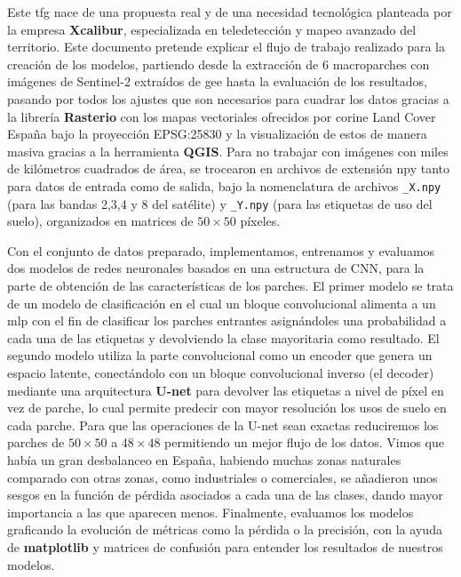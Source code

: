 Este \acrfull{tfg} nace de una propuesta real y de una necesidad tecnológica planteada por la empresa \textbf{Xcalibur}, especializada en 
teledetección y mapeo avanzado del territorio. Este documento pretende explicar el flujo de trabajo realizado para la creación de los modelos,
partiendo desde la extracción de 6 macroparches con imágenes de Sentinel-2 extraídos de \acrfull{gee} hasta la evaluación de los resultados, pasando 
por todos los ajustes que son necesarios para cuadrar los datos gracias a la librería \textbf{Rasterio} con los mapas vectoriales ofrecidos por 
\acrshort{corine} Land Cover España bajo la proyección EPSG:25830 y la visualización de estos de manera masiva gracias a la herramienta 
\textbf{QGIS}. Para no trabajar con imágenes con miles de kilómetros cuadrados de área, se trocearon en archivos de extensión npy tanto para 
datos de entrada como de salida, bajo la nomenclatura de archivos \texttt{\_X.npy} (para las bandas 2,3,4 y 8 del satélite) y \texttt{\_Y.npy} 
(para las etiquetas de uso del suelo), organizados en matrices de $50\times 50$ píxeles.


Con el conjunto de datos preparado, implementamos, entrenamos y evaluamos dos modelos de redes neuronales basados en una estructura de \acrshort{CNN},
para la parte de obtención de las características de los parches. El primer modelo se trata de un modelo de clasificación en el cual un bloque 
convolucional alimenta a un \acrshort{mlp} con el fin de clasificar los parches entrantes asignándoles una probabilidad a cada una de las etiquetas y devolviendo la clase mayoritaria 
como resultado. El segundo modelo utiliza la parte convolucional como un encoder que genera un espacio latente, conectándolo con un bloque convolucional
inverso (el decoder) mediante una arquitectura \textbf{U-net} para devolver las etiquetas a nivel de píxel en vez de parche, lo cual permite predecir con mayor resolución los usos de suelo en 
cada parche. Para que las operaciones de la U-net sean exactas reduciremos los parches de $50\times 50$ a $48\times 48$ permitiendo un mejor 
flujo de los datos. Vimos que había un gran desbalanceo en España, habiendo muchas zonas naturales comparado con otras zonas, como
industriales o comerciales, se añadieron unos sesgos en la función de pérdida asociados a cada una de las clases, dando mayor importancia a las 
que aparecen menos. Finalmente, evaluamos los modelos graficando la evolución de métricas como la pérdida o la precisión, con la ayuda de \textbf{matplotlib} y matrices de confusión
para entender los resultados de nuestros modelos. 

